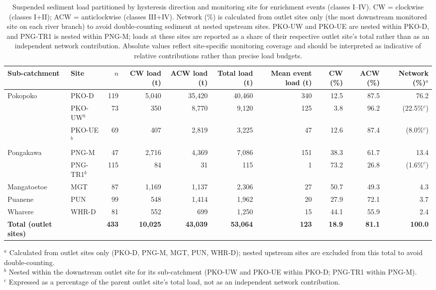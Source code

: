 \begin{table}
\centering
\caption{Suspended sediment load partitioned by hysteresis direction and monitoring site for enrichment events (classes I--IV). CW = clockwise (classes I+II); ACW = anticlockwise (classes III+IV). Network (\%) is calculated from outlet sites only (the most downstream monitored site on each river branch) to avoid double-counting sediment at nested upstream sites. PKO-UW and PKO-UE are nested within PKO-D, and PNG-TR1 is nested within PNG-M; loads at these sites are reported as a share of their respective outlet site's total rather than as an independent network contribution. Absolute values reflect site-specific monitoring coverage and should be interpreted as indicative of relative contributions rather than precise load budgets.}
\label{tab:load_by_direction}
\footnotesize
\setlength{\tabcolsep}{4pt}
\begin{tabular}{llrrrrrrrr}
\toprule
Sub-catchment & Site & $n$ & CW load (t) & ACW load (t) & Total load (t) & Mean event load (t) & CW (\%) & ACW (\%) & Network (\%)$^{a}$ \\
\midrule
Pokopoko & PKO-D & 119 & 5,040 & 35,420 & 40,460 & 340 & 12.5 & 87.5 & 76.2 \\
 & PKO-UW$^{b}$ & 73 & 350 & 8,770 & 9,120 & 125 & 3.8 & 96.2 & (22.5\%$^{c}$) \\
 & PKO-UE$^{b}$ & 69 & 407 & 2,819 & 3,225 & 47 & 12.6 & 87.4 & (8.0\%$^{c}$) \\
Pongakawa & PNG-M & 47 & 2,716 & 4,369 & 7,086 & 151 & 38.3 & 61.7 & 13.4 \\
 & PNG-TR1$^{b}$ & 115 & 84 & 31 & 115 & 1 & 73.2 & 26.8 & (1.6\%$^{c}$) \\
Mangatoetoe & MGT & 87 & 1,169 & 1,137 & 2,306 & 27 & 50.7 & 49.3 & 4.3 \\
Puanene & PUN & 99 & 548 & 1,414 & 1,962 & 20 & 27.9 & 72.1 & 3.7 \\
Wharere & WHR-D & 81 & 552 & 699 & 1,250 & 15 & 44.1 & 55.9 & 2.4 \\
\midrule
\textbf{Total (outlet sites)} & & \textbf{433} & \textbf{10,025} & \textbf{43,039} & \textbf{53,064} & \textbf{123} & \textbf{18.9} & \textbf{81.1} & \textbf{100.0} \\
\bottomrule
\end{tabular}

\vspace{0.5em}
\raggedright
\footnotesize
$^{a}$ Calculated from outlet sites only (PKO-D, PNG-M, MGT, PUN, WHR-D); nested upstream sites are excluded from this total to avoid double-counting. \\
$^{b}$ Nested within the downstream outlet site for its sub-catchment (PKO-UW and PKO-UE within PKO-D; PNG-TR1 within PNG-M). \\
$^{c}$ Expressed as a percentage of the parent outlet site's total load, not as an independent network contribution.
\end{table}
